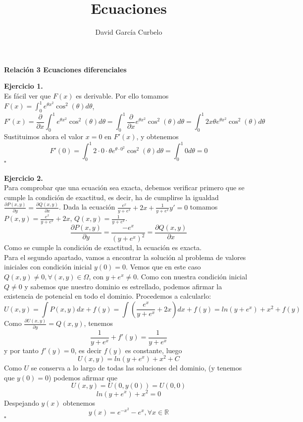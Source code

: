 \documentclass[fleqn]{article}
\author{David García Curbelo}
\title{Ecuaciones}
\newcommand*{\QED}{\hfill\ensuremath{\square}}
\begin{document}
    \setcounter{page}{1}
    \pagestyle{plain}

    \begin{center}
        {\large\bf{Relación 3 Ecuaciones diferenciales}} \\
        
    \end{center}


    {\bf{Ejercicio 1.}} \\

    Es fácil ver que $F(x)$ es derivable. Por ello tomamos $F(x)=\int_0^1 e^{\theta x^2} \cos^2 (\theta) d\theta$,
    $$F'(x)=\frac{\partial}{\partial x}\int_0^1 e^{\theta x^2} \cos^2 (\theta) d\theta = 
    \int_0^1 \frac{\partial}{\partial x} e^{\theta x^2} \cos^2 (\theta) d\theta
    = \int_0^1 2x\theta e^{\theta x^2} \cos^2 (\theta) d\theta$$
    Sustituimos ahora el valor $x=0$ en $F'(x)$, y obtenemos
    $$F'(0)=\int_0^1 2 \cdot 0 \cdot \theta e^{\theta \cdot 0^2} \cos^2 (\theta) d\theta = 
    \int_0^1 0 d\theta = 0$$ \QED \\ \\

    {\bf{Ejercicio 2.}} \\

    Para comprobar que una ecuación sea exacta, debemos verificar primero que se cumple la condición de exactitud,
    es decir, ha de cumplirse la igualdad $\frac{\partial P(x,y)}{\partial y}=\frac{\partial Q(x,y)}{\partial x}$.
    Dada la ecuación $\frac{e^x}{y+e^x} + 2x + \frac{1}{y+e^x}y' = 0$ tomamos $P(x,y)=\frac{e^x}{y+e^x} + 2x$, 
    $Q(x,y)=\frac{1}{y+e^x}$. 
    $$\frac{\partial P(x,y)}{\partial y}=\frac{-e^x}{(y+e^x)^2}=\frac{\partial Q(x,y)}{\partial x}$$
    Como se cumple la condición de exactitud, la ecuación es exacta. \\
    
    Para el segundo apartado, vamos a encontrar la solución al problema de valores iniciales con condición inicial
    $y(0)=0$. Vemos que en este caso $Q(x,y)\neq 0, \forall (x,y) \in \Omega$, con $y+e^x \neq 0$. Como con nuestra
    condición inicial $Q \neq 0$ y sabemos que nuestro dominio es estrellado, podemos afirmar la existencia de potencial
    en todo el dominio. Procedemos a calcularlo:
    $$U(x,y)=\int P(x,y) dx +f(y)= \int (\frac{e^x}{y+e^x} + 2x)dx + f(y) = ln(y+e^x) + x^2 +f(y)$$
    Como $\frac{\partial U(x,y)}{\partial y}=Q(x,y)$, tenemos
    $$\frac{1}{y+e^x} + f'(y)=\frac{1}{y+e^x}$$
    y por tanto $f'(y)=0$, es decir $f(y)$ es constante, luego 
    $$U(x,y)=ln(y+e^x) + x^2+C$$
    Como $U$ se conserva a lo largo de todas las soluciones del dominio, (y tenemos que $y(0)=0$) podemos afirmar que
    $$U(x,y)=U(0,y(0))=U(0,0)$$
    $$ln(y+e^x) + x^2=0$$
    Despejando $y(x)$ obtenemos
    $$y(x)=e^{-x^2}-e^x, \forall x \in \mathds{R}$$
    \QED \\ \\
\end{document}
